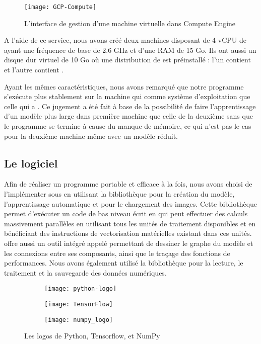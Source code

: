\begin{figure}[h]
  \centering
  \texttt{[image: GCP-Compute]}
  \caption{L'interface de gestion d'une machine virtuelle dans Compute Engine}
\end{figure}

A l'aide de ce service, nous avons créé deux machines disposant de 4 vCPU
de  ayant une fréquence de base de 2.6 GHz et d'une
RAM de 15 Go. Ils ont aussi un disque dur virtuel de 10 Go où une distribution
de  est préinstallé : l'un contient  et l'autre
contient .

Ayant les mêmes caractéristiques, nous avons remarqué que notre programme s'exécute
plus stablement sur la machine qui 
comme système d'exploitation que celle qui a . Ce jugement a été fait à
base de la possibilité de faire l'apprentissage d'un modèle plus large dans première machine
que celle de la deuxième sans que le programme se termine à cause du manque de mémoire,
ce qui n'est pas le cas pour la deuxième machine même avec un modèle réduit.

\subsection{Le logiciel}

Afin de réaliser un programme portable et efficace à la fois, nous avons choisi
de l'implémenter sous  \cite{python3} en utilisant la bibliothèque  \cite{DBLP:journals/corr/AbadiABBCCCDDDG16}
pour la création du modèle, l'apprentissage automatique et pour le chargement des images.
Cette bibliothèque permet d'exécuter un code de bas niveau écrit en  \cite{stroustrup1995c++}
qui peut effectuer des calculs massivement parallèles en utilisant tous les unités
de traitement disponibles et en bénéficiant des instructions de vectorisation matérielles
existant dans ces unités.  offre aussi un outil intégré
appelé  permettant de dessiner le graphe du modèle et les
connexions entre ses composants, ainsi que le traçage des fonctions de performances.
Nous avons également utilisé la bibliothèque  \cite{walt2011numpy} pour la lecture,
le traitement et la sauvegarde des données numériques.

\begin{figure}[h]
\centering
\begin{subfigure}{0.3\textwidth}\texttt{[image: python-logo]}\end{subfigure}
\begin{subfigure}{0.3\textwidth}\texttt{[image: TensorFlow]}\end{subfigure}
\begin{subfigure}{0.3\textwidth}\texttt{[image: numpy\_logo]}\end{subfigure}
\caption{Les logos de Python, Tensorflow, et NumPy}
\end{figure}


